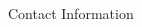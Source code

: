 \documentclass[final]{beamer}
\newlength{\onecolwid}
\begin{document}
\begin{frame}[t]
\begin{columns}[t]
\begin{column}{\onecolwid}
\begin{alertblock}{Contact Information}
\begin{columns}[onlytextwidth]
\begin{column}{0.17\textwidth}
\end{column}
\end{columns}

\end{alertblock}

\end{column} %

\end{columns} %

\end{frame} %
\end{document}

